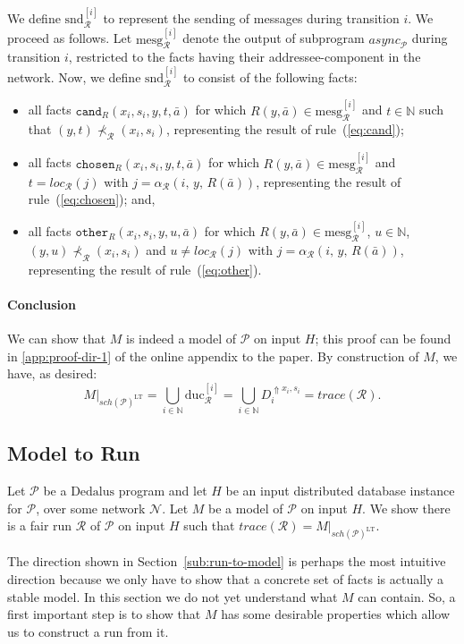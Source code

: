 \documentclass{tlp}
\newcommand{\langname}[1]{\text{#1}}  \newcommand{\pred}[1]{\mathtt{#1}}  \newcommand{\fname}[1]{\mathit{#1}}  \newcommand{\sq}[1]{`{#1}'}
\newcommand{\dedalus}{\langname{Dedalus}}
\newcommand{\Nat}{\mathbb{N}}  \newcommand{\len}[1]{|#1|} \newcommand{\rom}[1]{\text{\emph{(#1)}}} \newcommand{\romI}{\rom i}
\newcommand{\ded}{\mathcal{P}}
\newcommand{\proj}[2]{#1|_{#2}}
\newcommand{\schof}[1]{\fname{sch}(#1)}
\newcommand{\nw}{\mathcal{N}}
\newcommand{\toloct}[1]{#1^{\mathrm{LT}}}
\newcommand{\addlt}[3]{#1^{\Uparrow#2,#3}}
\newcommand{\chosen}{\pred{chosen}}
\newcommand{\other}{\pred{other}}
\newcommand{\cand}{\pred{cand}}
\newcommand{\run}{\mathcal{R}}
\newcommand{\trace}[1]{\fname{trace}(#1)}
\newcommand{\async}[1]{\fname{async}_{#1}}
\newcommand{\locR}[1]{\fname{loc}_{\run}(#1)}
\newcommand{\arr}{\alpha_{\run}}
\newcommand{\sliceduc}[1]{\text{duc}_{\run}^{[#1]}}
\newcommand{\slicesnd}[1]{\text{snd}_{\run}^{[#1]}}
\newcommand{\mesg}[1]{\mathrm{mesg}_{\run}^{[#1]}}
\newcommand{\caus}{\prec_{\run}}
\begin{document}
We define $\slicesnd i$ to represent the sending of messages during
transition $i$. We proceed as follows. Let $\mesg i$ denote the
output of subprogram $\async{\ded}$ during transition $i$, restricted
to the facts having their addressee-component in the network. Now,
we define $\slicesnd i$ to consist of the following facts:
\begin{itemize}
\item all facts $\cand_{R}(x_{i},s_{i},y,t,\bar{a})$ for which $R(y,\bar{a})\in\mesg i$
and $t\in\Nat$ such that $(y,t)\not\caus(x_{i},s_{i})$, representing
the result of rule~(\ref{eq:cand});
\item all facts $\chosen_{R}(x_{i},s_{i},y,t,\bar{a})$ for which $R(y,\bar{a})\in\mesg i$
and $t=\locR j$ with $j=\arr(i,\, y,\, R(\bar{a}))$, representing
the result of rule~(\ref{eq:chosen}); and,
\item all facts $\other_{R}(x_{i},s_{i},y,u,\bar{a})$ for which $R(y,\bar{a})\in\mesg i$,
$u\in\Nat$, $(y,u)\not\caus(x_{i},s_{i})$ and $u\neq\locR j$ with
$j=\arr(i,\, y,\, R(\bar{a}))$, representing the result of rule~(\ref{eq:other}).
\end{itemize}





\paragraph*{Conclusion}

We can show that $M$ is indeed a model
of $\ded$ on input $H$; this proof can be found in \ref{app:proof-dir-1} of the online appendix to the paper.
By construction of $M$, we have, as desired:
\[
\proj M{\toloct{\schof{\ded}}}=\bigcup_{i\in\Nat}\sliceduc i=\bigcup_{i\in\Nat}\addlt{D_{i}}{x_{i}}{s_{i}}=\trace{\run}.
\]



\subsection{Model to Run}

\label{sub:model-to-run}

Let $\ded$ be a $\dedalus$ program and let $H$ be an input distributed
database instance for $\ded$, over some network $\nw$. Let $M$
be a model of $\ded$ on input $H$. We show there is a fair run $\run$
of $\ded$ on input $H$ such that $\trace{\run}=\proj M{\toloct{\schof{\ded}}}$. 

The direction shown in Section~\ref{sub:run-to-model} is perhaps
the most intuitive direction because we only have to show that a concrete
set of facts is actually a stable model. In this section we do not
yet understand what $M$ can contain. So, a first important step is
to show that $M$ has some desirable properties which allow us to
construct a run from it.
\end{document}
